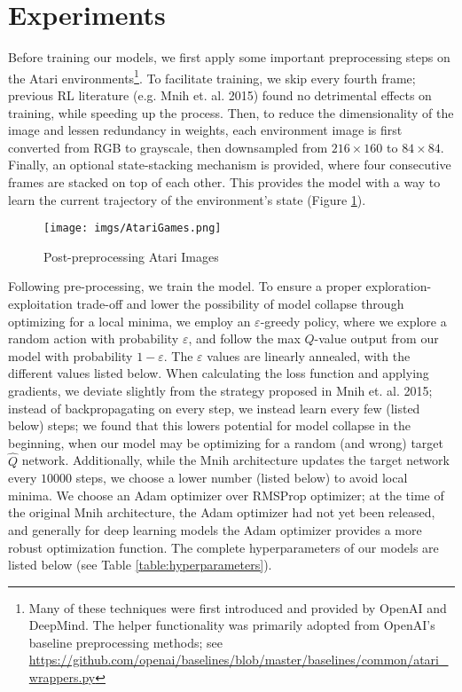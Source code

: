 \documentclass{article} %
\begin{document}
\section{Experiments}

Before training our models, we first apply some important preprocessing steps on the Atari
environments\footnote{Many of these techniques were first introduced and provided by OpenAI and
DeepMind. The helper functionality was primarily adopted from OpenAI's baseline preprocessing
methods; see
\url{https://github.com/openai/baselines/blob/master/baselines/common/atari_wrappers.py}}. To
facilitate training, we skip every fourth frame; previous RL literature (e.g. Mnih et. al. 2015)
found no detrimental effects on training, while speeding up the process. Then, to reduce the
dimensionality of the image and lessen redundancy in weights, each environment image is first
converted from RGB to grayscale, then downsampled from $216\times 160$ to $84\times 84$. Finally, an
optional state-stacking mechanism is provided, where four consecutive frames are stacked on top of
each other. This provides the model with a way to learn the current trajectory of the environment's
state (Figure \ref{fig:imgs-AtariGames-png}). 

\begin{figure}[htpb]
  \centering
  \texttt{[image: imgs/AtariGames.png]}
  \caption{Post-preprocessing Atari Images}
  \label{fig:imgs-AtariGames-png}
\end{figure}

Following pre-processing, we train the model. To ensure a proper exploration-exploitation trade-off
and lower the possibility of model collapse through optimizing for a local minima, we employ an
$\varepsilon$-greedy policy, where we explore a random action with probability $\varepsilon$, and
follow the max $Q$-value output from our model with probability $1-\varepsilon$. The $\varepsilon$
values are linearly annealed, with the different values listed below. When calculating the loss
function and applying gradients, we deviate slightly from the strategy proposed in Mnih et. al.
2015; instead of backpropagating on every step, we instead learn every few (listed below)
steps; we found that this lowers potential for model collapse in the beginning, when our model may
be optimizing for a random (and wrong) target $\hat{Q}$ network. Additionally, while the Mnih
architecture updates the target network every $10000$ steps, we choose a lower number (listed below)
to avoid local minima. We choose an Adam optimizer over RMSProp optimizer; at the time of the
original Mnih architecture, the Adam optimizer had not yet been released, and generally for deep
learning models the Adam optimizer provides a more robust optimization function. The complete
hyperparameters of our models are listed below (see Table \ref{table:hyperparameters}).
\end{document}
